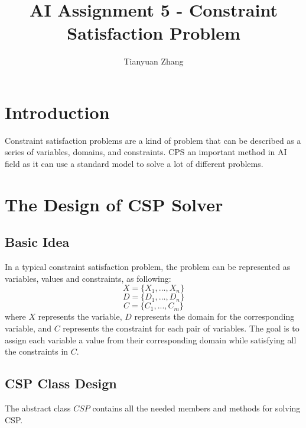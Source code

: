 \documentclass{article}
\title{AI Assignment 5 - Constraint Satisfaction Problem}
\author{Tianyuan Zhang}
\begin{document}
\maketitle

\section{Introduction}
Constraint satisfaction problems are a kind of problem that can be described as a series of variables, domains, and constraints. CPS an important method in AI field as it can use a standard model to solve a lot of different problems.

\section{The Design of CSP Solver}
\subsection{Basic Idea}
In a typical constraint satisfaction problem, the problem can be represented as variables, values and constraints, as following:
$$X = \{X_1, ..., X_n\}$$
$$D = \{D_1, ..., D_n\}$$
$$C = \{C_1, ..., C_m\}$$
where $X$ represents the variable, $D$ represents the domain for the corresponding variable, and $C$ represents the constraint for each pair of variables. The goal is to assign each variable a value from their corresponding domain while satisfying all the constraints in $C$.

\subsection{CSP Class Design}
The abstract class $CSP$ contains all the needed members and methods for solving CSP.
\end{document}
